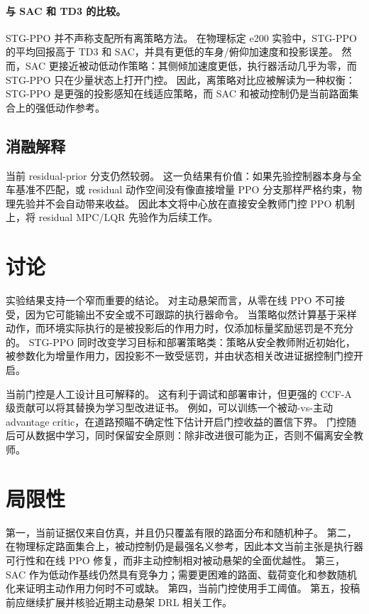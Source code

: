 \documentclass[UTF8,letterpaper,twocolumn]{ctexart}
\begin{document}
\paragraph{与 SAC 和 TD3 的比较。}
STG-PPO 并不声称支配所有离策略方法。
在物理标定 e200 实验中，STG-PPO 的平均回报高于 TD3 和 SAC，并具有更低的车身/俯仰加速度和投影误差。
然而，SAC 更接近被动低动作策略：其侧倾加速度更低，执行器活动几乎为零，而 STG-PPO 只在少量状态上打开门控。
因此，离策略对比应被解读为一种权衡：STG-PPO 是更强的投影感知在线适应策略，而 SAC 和被动控制仍是当前路面集合上的强低动作参考。

\subsection{消融解释}

当前 residual-prior 分支仍然较弱。
这一负结果有价值：如果先验控制器本身与全车基准不匹配，或 residual 动作空间没有像直接增量 PPO 分支那样严格约束，物理先验并不会自动带来收益。
因此本文将中心放在直接安全教师门控 PPO 机制上，将 residual MPC/LQR 先验作为后续工作。

\section{讨论}

实验结果支持一个窄而重要的结论。
对主动悬架而言，从零在线 PPO 不可接受，因为它可能输出不安全或不可跟踪的执行器命令。
当策略似然计算基于采样动作，而环境实际执行的是被投影后的作用力时，仅添加标量奖励惩罚是不充分的。
STG-PPO 同时改变学习目标和部署策略类：策略从安全教师附近初始化，被参数化为增量作用力，因投影不一致受惩罚，并由状态相关改进证据控制门控开启。

当前门控是人工设计且可解释的。
这有利于调试和部署审计，但更强的 CCF-A 级贡献可以将其替换为学习型改进证书。
例如，可以训练一个被动-vs-主动 advantage critic，在道路预瞄不确定性下估计开启门控收益的置信下界。
门控随后可从数据中学习，同时保留安全原则：除非改进很可能为正，否则不偏离安全教师。

\section{局限性}

第一，当前证据仅来自仿真，并且仍只覆盖有限的路面分布和随机种子。
第二，在物理标定路面集合上，被动控制仍是最强名义参考，因此本文当前主张是执行器可行性和在线 PPO 修复，而非主动控制相对被动悬架的全面优越性。
第三，SAC 作为低动作基线仍然具有竞争力；需要更困难的路面、载荷变化和参数随机化来证明主动作用力何时不可或缺。
第四，当前门控使用手工阈值。
第五，投稿前应继续扩展并核验近期主动悬架 DRL 相关工作。
\end{document}
